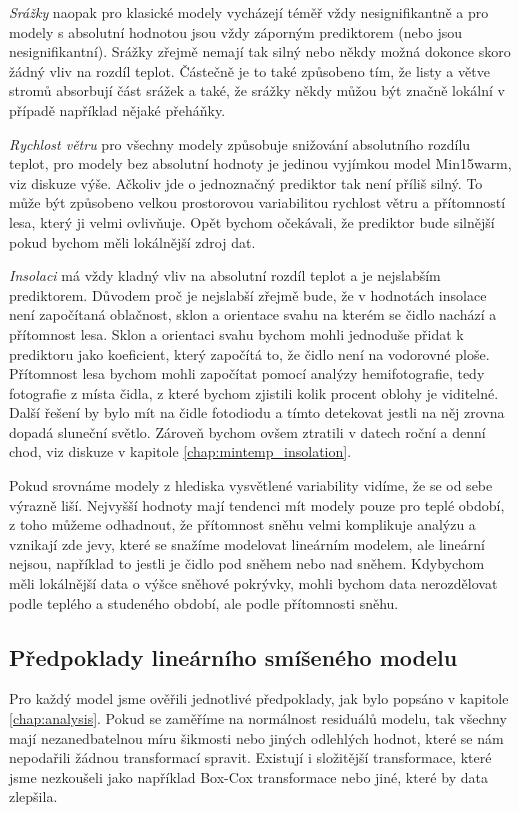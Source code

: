 \textit{Srážky} naopak pro klasické modely vycházejí téměř vždy nesignifikantně a pro modely s absolutní hodnotou jsou vždy záporným prediktorem (nebo jsou nesignifikantní). Srážky zřejmě nemají tak silný nebo někdy možná dokonce skoro žádný vliv na rozdíl teplot. Částečně je to také způsobeno tím, že listy a větve stromů absorbují část srážek a také, že srážky někdy můžou být značně lokální v případě například nějaké přeháňky.

\textit{Rychlost větru} pro všechny modely způsobuje snižování absolutního rozdílu teplot, pro modely bez absolutní hodnoty je jedinou vyjímkou model Min15warm, viz diskuze výše. Ačkoliv jde o jednoznačný prediktor tak není příliš silný. To může být způsobeno velkou prostorovou variabilitou rychlost větru a přítomností lesa, který ji velmi ovlivňuje. Opět bychom očekávali, že prediktor bude silnější pokud bychom měli lokálnější zdroj dat.

\textit{Insolaci} má vždy kladný vliv na absolutní rozdíl teplot a je nejslabším prediktorem. Důvodem proč je nejslabší zřejmě bude, že v hodnotách insolace není započítaná oblačnost, sklon a orientace svahu na kterém se čidlo nachází a přítomnost lesa. Sklon a orientaci svahu bychom mohli jednoduše přidat k prediktoru jako koeficient, který započítá to, že čidlo není na vodorovné ploše. Přítomnost lesa bychom mohli započítat pomocí analýzy hemifotografie, tedy fotografie z místa čidla, z které bychom zjistili kolik procent oblohy je viditelné. Další řešení by bylo mít na čidle fotodiodu a tímto detekovat jestli na něj zrovna dopadá sluneční světlo. Zároveň bychom ovšem ztratili v datech roční a denní chod, viz diskuze v kapitole \ref{chap:mintemp_insolation}.

Pokud srovnáme modely z hlediska vysvětlené variability vidíme, že se od sebe výrazně liší. Nejvyšší hodnoty mají tendenci mít modely pouze pro teplé období, z toho můžeme odhadnout, že přítomnost sněhu velmi komplikuje analýzu a vznikají zde jevy, které se snažíme modelovat lineárním modelem, ale lineární nejsou, například to jestli je čidlo pod sněhem nebo nad sněhem. Kdybychom měli lokálnější data o výšce sněhové pokrývky, mohli bychom data nerozdělovat podle teplého a studeného období, ale podle přítomnosti sněhu.

\subsection{Předpoklady lineárního smíšeného modelu}
Pro každý model jsme ověřili jednotlivé předpoklady, jak bylo popsáno v kapitole \ref{chap:analysis}. Pokud se zaměříme na normálnost residuálů modelu, tak všechny mají nezanedbatelnou míru šikmosti nebo jiných odlehlých hodnot, které se nám nepodařili žádnou transformací spravit. Existují i složitější transformace, které jsme nezkoušeli jako například Box-Cox transformace nebo jiné, které by data zlepšila. 

